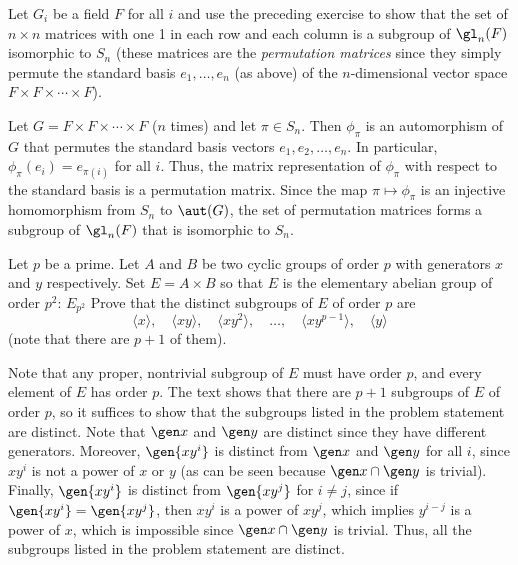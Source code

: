 \begin{exercise}\label{ex5.1.9}
    Let $G_i$ be a field $F$ for all $i$ and use the preceding exercise to show that the set of $n \times n$ matrices with one 1 in each row and each column is a subgroup of $\gl_n(F)$ isomorphic to $S_n$ (these matrices are the \textit{permutation matrices} since they simply permute the standard basis $e_1, \ldots, e_n$ (as above) of the $n$-dimensional vector space $F \times F \times \cdots \times F$).
\end{exercise}

\begin{sol}
    Let $G = F \times F \times \cdots \times F$ ($n$ times) and let $\pi \in S_n$. Then $\phi_\pi$ is an automorphism of $G$ that permutes the standard basis vectors $e_1, e_2, \ldots, e_n$. In particular, $\phi_\pi(e_i) = e_{\pi(i)}$ for all $i$. Thus, the matrix representation of $\phi_\pi$ with respect to the standard basis is a permutation matrix. Since the map $\pi \mapsto \phi_\pi$ is an injective homomorphism from $S_n$ to $\aut(G)$, the set of permutation matrices forms a subgroup of $\gl_n(F)$ that is isomorphic to $S_n$.
\end{sol}

\begin{exercise}\label{ex5.1.10}
    Let $p$ be a prime. Let $A$ and $B$ be two cyclic groups of order $p$ with generators $x$ and $y$ respectively. Set $E = A \times B$ so that $E$ is the elementary abelian group of order $p^2$: $E_{p^2}$ Prove that the distinct subgroups of $E$ of order $p$ are
    \[\langle x \rangle, \quad \langle xy \rangle, \quad \langle xy^2 \rangle, \quad \ldots, \quad \langle xy^{p-1} \rangle, \quad \langle y \rangle\] (note that there are $p + 1$ of them).
\end{exercise}

\begin{sol}
    Note that any proper, nontrivial subgroup of $E$ must have order $p$, and every element of $E$ has order $p$. The text shows that there are $p + 1$ subgroups of $E$ of order $p$, so it suffices to show that the subgroups listed in the problem statement are distinct. Note that $\gen x$ and $\gen y$ are distinct since they have different generators. Moreover, $\gen{xy^i}$ is distinct from $\gen x$ and $\gen y$ for all $i$, since $xy^i$ is not a power of $x$ or $y$ (as can be seen because $\gen x \cap \gen y$ is trivial). Finally, $\gen{xy^i}$ is distinct from $\gen{xy^j}$ for $i \neq j$, since if $\gen{xy^i} = \gen{xy^j}$, then $xy^i$ is a power of $xy^j$, which implies $y^{i-j}$ is a power of $x$, which is impossible since $\gen x \cap \gen y$ is trivial. Thus, all the subgroups listed in the problem statement are distinct.
\end{sol}

